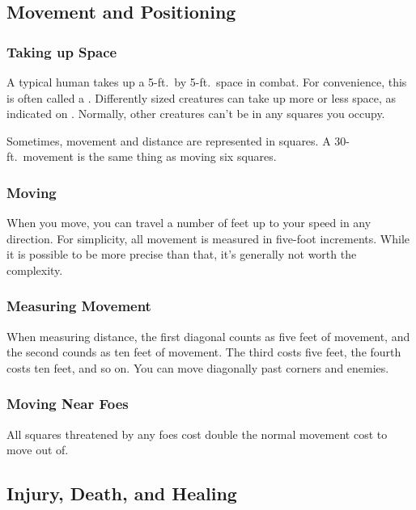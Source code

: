     \subsection{Movement and Positioning}\label{Movement and Positioning}

        \subsubsection{Taking up Space}
            A typical human takes up a 5-ft.\ by 5-ft.\ space in combat.
            For convenience, this is often called a .
            Differently sized creatures can take up more or less space, as indicated on .
            Normally, other creatures can't be in any squares you occupy.

            Sometimes, movement and distance are represented in squares.
            A 30-ft.\ movement is the same thing as moving six squares.

        \subsubsection{Moving}

            When you move, you can travel a number of feet up to your speed in any direction.
            For simplicity, all movement is measured in five-foot increments.
            While it is possible to be more precise than that, it's generally not worth the complexity.

        \subsubsection{Measuring Movement}

             When measuring distance, the first diagonal counts as five feet of movement, and the second counds as ten feet of movement.
            The third costs five feet, the fourth costs ten feet, and so on.
            You can move diagonally past corners and enemies.

        \subsubsection{Moving Near Foes}\label{Moving Near Foes}
            All squares threatened by any foes cost double the normal movement cost to move out of.

    \subsection{Injury, Death, and Healing}\label{Injury, Death, and Healing}

